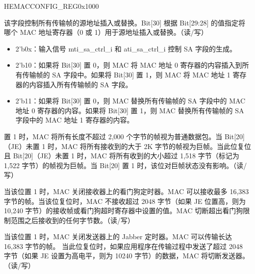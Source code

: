\begin{register}{H}{EMACCONFIG\_REG}{0x1000}\label{regdesc:EMACCONFIGREG}
%
%
%
%
%
%
%
%
%
%
%
%
%
%
%
%
%
%
%
%
%
%
%
%
\regnewline%
\begin{regdesc}\begin{reglist}
\item [SAIRC]该字段控制所有传输帧的源地址插入或替换。Bit[30] 根据 Bit[29:28] 的值指定将哪个 MAC 地址寄存器（0 或 1）用于源地址插入或替换。（读/写）
\begin{itemize}
\item 2'b0x：输入信号 mti\_sa\_ctrl\_i 和 ati\_sa\_ctrl\_i 控制 SA 字段的生成。
\item 2'b10：如果将 Bit[30] 置 0，则 MAC 将 MAC 地址 0 寄存器的内容插入到所有传输帧的 SA 字段中。如果将 Bit[30] 置 1，则 MAC 将 MAC 地址 1 寄存器的内容插入所有传输帧的 SA 字段。
\item 2'b11：如果将 Bit[30] 置 0，则 MAC 替换所有传输帧的 SA 字段中的 MAC 地址 0 寄存器的内容。如果将 Bit[30] 置 1，则 MAC 替换所有传输帧的 SA 字段中的 MAC 地址 1 寄存器的内容。
\end{itemize}
\item [ASS2KP]置 1 时，MAC 将所有长度不超过 2,000 个字节的帧视为普通数据包。当 Bit[20]（JE）未置 1 时，MAC 将所有接收到的大于 2K 字节的帧视为巨帧。当此位复位且 Bit[20]（JE）未置 1 时，MAC 将所有收到的大小超过 1,518 字节（标记为 1,522 字节）的帧视为巨帧。当 Bit[20] 置 1 时，该位对巨帧状态没有影响。（读/写）
\item [EMACWATCHDOG]当该位置 1 时，MAC 关闭接收器上的看门狗定时器。MAC 可以接收最多 16,383 字节的帧。当该位复位时，MAC 不接收超过 2048 字节（如果 JE 位置高，则为 10,240 字节）的接收帧或看门狗超时寄存器中设置的值。MAC 切断超出看门狗限制范围之后接收到的任何字节数。（读/写）
\item [EMACJABBER]当该位置 1 时，MAC 关闭发送器上的 Jabber 定时器。MAC 可以传输长达 16,383 字节的帧。 当此位复位时，如果应用程序在传输过程中发送了超过 2048 字节（如果 JE 设置为高电平，则为 10240 字节）的数据，MAC 将切断发送器。（读/写）

\end{reglist}
\end{regdesc}
\end{register}
